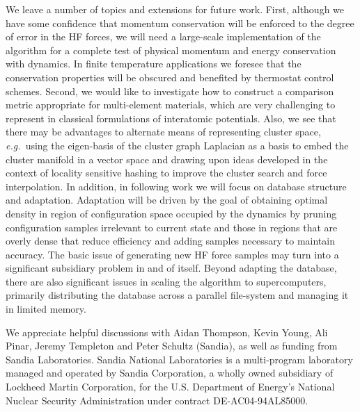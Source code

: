 \documentclass[journal=jctcce,manuscript=article]{achemso}
\newcommand{\eg}{{\it e.g.\ }}
\begin{document}
We leave a number of topics and extensions for future work.
First, although we have some confidence that momentum conservation will be enforced to the degree of error in the HF forces, 
we will need a large-scale  implementation of the algorithm for a complete test of physical momentum and energy conservation with dynamics.
In finite temperature applications we foresee that the conservation properties will be obscured and benefited by thermostat control schemes.
Second, we would like to investigate how to construct a comparison metric appropriate for multi-element materials, which are very challenging to represent in classical formulations of interatomic potentials.
Also, we see that there may be advantages to alternate means of representing cluster space, \eg using the eigen-basis of the cluster graph Laplacian as a basis to embed the cluster manifold in a vector space and drawing upon ideas developed in the context of locality sensitive hashing \cite{leskovec2014mining} to improve the cluster search and force interpolation. %
In addition, in following work we will focus on database structure and adaptation. 
Adaptation will be driven by the goal of obtaining optimal density in region of configuration space occupied by the dynamics by pruning configuration samples irrelevant to current state and those in regions that are overly dense that reduce efficiency and adding samples necessary to maintain accuracy.
The basic issue of generating new HF force samples may turn into a significant subsidiary problem in and of itself.
Beyond adapting the database, there are also significant issues in scaling the algorithm to supercomputers, primarily distributing the database across a parallel file-system and managing it in limited memory. 

\begin{acknowledgement}

We appreciate helpful discussions with Aidan Thompson, Kevin Young, Ali Pinar, Jeremy Templeton and Peter Schultz (Sandia), as well as funding from Sandia Laboratories.
Sandia National Laboratories is a multi-program laboratory managed and operated by Sandia Corporation, a wholly owned subsidiary of Lockheed Martin Corporation, for the U.S. Department of Energy's National Nuclear Security Administration under contract DE-AC04-94AL85000.

\end{acknowledgement}
\end{document}
